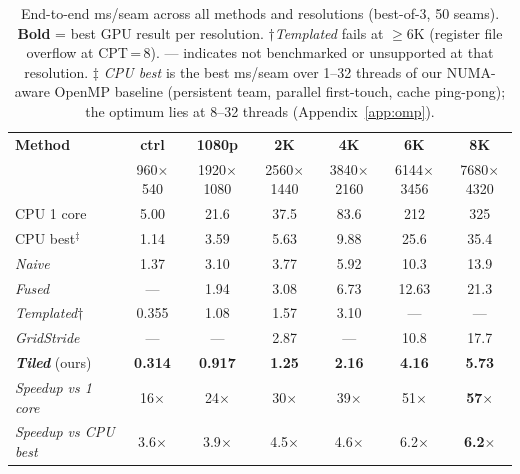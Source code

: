 \begin{table}[t]
\caption{End-to-end ms/seam across all methods and resolutions (best-of-3, 50 seams).
\textbf{Bold} = best GPU result per resolution.
$\dagger$\emph{Templated} fails at ${\ge}6$K (register file overflow at CPT\,=\,8).
--- indicates not benchmarked or unsupported at that resolution.
$\ddagger$ \emph{CPU best} is the best ms/seam over 1--32 threads of our
NUMA-aware OpenMP baseline (persistent team, parallel first-touch, cache
ping-pong); the optimum lies at 8--32 threads (Appendix~\ref{app:omp}).}
\label{tab:fullresults}
\centering
\begin{tabular}{@{}lcccccc@{}}
\toprule
\textbf{Method} & \textbf{ctrl} & \textbf{1080p} & \textbf{2K} & \textbf{4K} & \textbf{6K} & \textbf{8K} \\
 & {\scriptsize 960$\times$540} & {\scriptsize 1920$\times$1080} & {\scriptsize 2560$\times$1440} & {\scriptsize 3840$\times$2160} & {\scriptsize 6144$\times$3456} & {\scriptsize 7680$\times$4320} \\
\midrule
CPU 1 core                   & 5.00  & 21.6  & 37.5  & 83.6  & 212   & 325   \\
CPU best$^\ddagger$          & 1.14  & 3.59  & 5.63  & 9.88  & 25.6  & 35.4  \\
\midrule
\emph{Naive}                 & 1.37  & 3.10  & 3.77  & 5.92  & 10.3  & 13.9  \\
\emph{Fused}                 & ---   & 1.94  & 3.08  & 6.73  & 12.63 & 21.3  \\
\emph{Templated}$\dagger$    & 0.355 & 1.08  & 1.57  & 3.10  & ---   & ---   \\
\emph{GridStride}            & ---   & ---   & 2.87  & ---   & 10.8  & 17.7  \\
\textbf{\emph{Tiled}} (ours) & \textbf{0.314} & \textbf{0.917} & \textbf{1.25} & \textbf{2.16} & \textbf{4.16} & \textbf{5.73} \\
\midrule
\emph{Speedup vs 1 core}     & 16$\times$ & 24$\times$ & 30$\times$ & 39$\times$ & 51$\times$ & \textbf{57$\times$} \\
\emph{Speedup vs CPU best}   & 3.6$\times$ & 3.9$\times$ & 4.5$\times$ & 4.6$\times$ & 6.2$\times$ & \textbf{6.2$\times$} \\
\bottomrule
\end{tabular}
\end{table}
